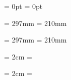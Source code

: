 



\unprotect


\voffset = 0pt %
\hoffset = 0pt %


\newdimen\papierhoogte       \papierhoogte         = 297mm
\newdimen\papierbreedte      \papierbreedte        = 210mm

\newdimen\printpapierhoogte  \printpapierhoogte    = 297mm
\newdimen\printpapierbreedte \printpapierbreedte   = 210mm

\newdimen\zethoogte                                %
\newdimen\zetbreedte                               %

\newdimen\teksthoogte                              %
\newdimen\tekstbreedte                             %

\newdimen\kopwit              \kopwit              = 2cm
\newdimen\rugwit              \rugwit              = \kopwit

\newdimen\hoofdhoogte         \hoofdhoogte         = 2cm
\newdimen\voethoogte          \voethoogte          = \hoofdhoogte

